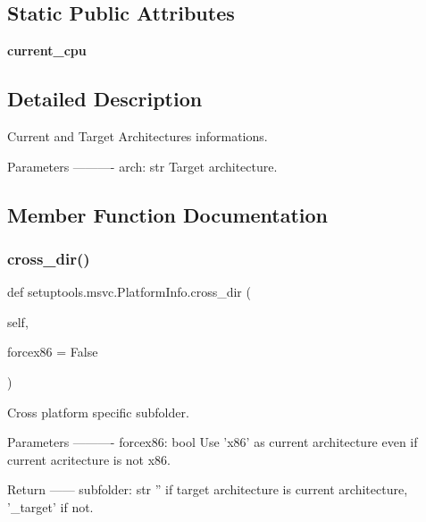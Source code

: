 \subsection*{Static Public Attributes}
\begin{DoxyCompactItemize}
\item 
\mbox{\label{classsetuptools_1_1msvc_1_1_platform_info_afd49633c8aa48d6a0162a9ce5aaa72bc}} 
{\bfseries current\+\_\+cpu}
\end{DoxyCompactItemize}


\subsection{Detailed Description}
\begin{DoxyVerb}Current and Target Architectures informations.

Parameters
----------
arch: str
    Target architecture.
\end{DoxyVerb}
 

\subsection{Member Function Documentation}
\mbox{\label{classsetuptools_1_1msvc_1_1_platform_info_a9cd7bd8ff66ddc3b79fe7448c52f1504}} 
\subsubsection{\texorpdfstring{cross\+\_\+dir()}{cross\_dir()}}
{\footnotesize\ttfamily def setuptools.\+msvc.\+Platform\+Info.\+cross\+\_\+dir (\begin{DoxyParamCaption}\item[{}]{self,  }\item[{}]{forcex86 = {\ttfamily False} }\end{DoxyParamCaption})}

\begin{DoxyVerb}Cross platform specific subfolder.

Parameters
----------
forcex86: bool
    Use 'x86' as current architecture even if current acritecture is
    not x86.

Return
------
subfolder: str
    '' if target architecture is current architecture,
    '\current_target' if not.
\end{DoxyVerb}
 \mbox{\label{classsetuptools_1_1msvc_1_1_platform_info_a5d8f69638b5c98cc654174f4c944d1ab}} 
